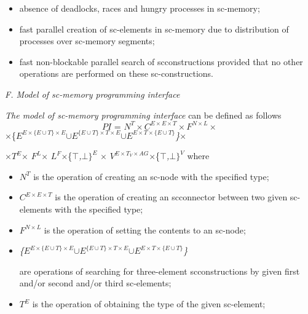 \documentclass{article}
\begin{document}
 
\begin{multicols}{2} 

\begin{itemize}
\itemsep=0mm
  \item absence of deadlocks, races and hungry processes
in sc-memory;
  \item  fast parallel creation of sc-elements in sc-memory
due to distribution of processes over sc-memory
segments;
  \item fast non-blockable parallel search of scconstructions provided that no other operations are
performed on these sc-constructions.
\end{itemize}
  \textit {F. Model of sc-memory programming interface}

  \textit {The model of sc-memory programming interface} {can
be defined as follows}
 \[\textit{PI = $N^T$}\times\textit{$C^{E\times{E\times{T}}}$}\times\textit{$F^{N\times{L}}$}\times\] 
\textit{$\times$}\{\textit{$E^{E\times{\{E\cup{T\}\times{E}}}}$}\textit{$\cup$}\textit{$E^{\{E\cup{T\}\times{T\times{E}}}}$}\textit{$\cup$}\textit{$E^{E\times{T\times{\{E\cup{T\}}}}}$\}\textit{$\times$}}
 
\textit{$\times$}\textit{$T^E$}\textit{$\times$} \textit{$F^L$}\textit{$\times$} \textit{$L^F$}\textit{$\times$}\{$\top$\textit{,}$\bot$\textit{$\}^E$} $\times$ \textit{$V^{E\times{{T_V}\times{{AG}}}}$}$\times$\{$\top$\textit{,}$\bot$\textit{$\}^V$}
{where}
\begin{itemize}
\itemsep=0mm

 \item{\textit{$N^T$}}
 is the operation of creating an sc-node with the
specified type;
 \item{\textit{$C^{E\times{E\times{T}}}$}}
is the operation of creating an scconnector between two given sc-elements with the
specified type;
\item{\textit{$F^{N\times{L}}$}}
is the operation of setting the contents to an
sc-node;
\item{\textit{\{\textit{$E^{E\times{\{E\cup{T\}\times{E}}}}$}\textit{$\cup$}\textit{$E^{\{E\cup{T\}\times{T\times{E}}}}$}\textit{$\cup$}\textit{$E^{E\times{T\times{\{E\cup{T\}}}}}$\}}}}

are operations of searching for three-element scconstructions by given first and/or second and/or
third sc-elements;

\item{\textit{$T^E$}}
is the operation of obtaining the type of the
given sc-element;


\end{itemize}
\end{multicols}
\end{document}
